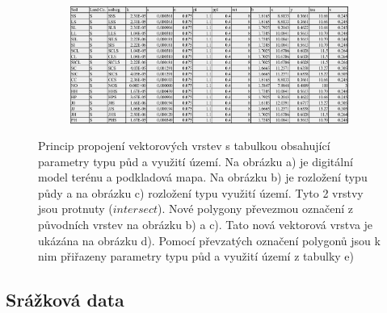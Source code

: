 \begin{figure}[t!]
\begin{subfigure}[b]{0.4\linewidth}
    \caption{\label{fig:prunik}}
  \end{subfigure}\\
  \begin{subfigure}[b]{0.8\linewidth}
    \centering\includegraphics[width=1\linewidth]{./img/soilvegtablo.png}
    \caption{\label{fig:soilvegtablo}}
  \end{subfigure}%
  \caption{Princip propojení vektorových vrstev s tabulkou obsahující parametry typu půd a využití území. Na obrázku a) je digitální model terénu a podkladová mapa. Na obrázku b) je rozložení typu půdy a na obrázku c) rozložení typu využití území. Tyto 2 vrstvy jsou protnuty ($intersect$). Nové polygony převezmou označení z původních vrstev na obrázku b) a c). Tato nová vektorová vrstva je ukázána na obrázku d). Pomocí převzatých označení polygonů jsou k nim přiřazeny parametry typu půd a využití území z tabulky e)}
  \label{fig:soillu}
\end{figure}




























\subsection{Srážková data} \label{sec:vstupsrazka}

